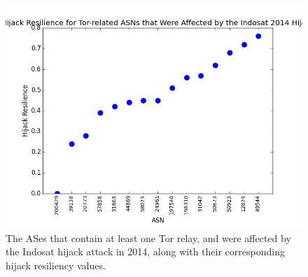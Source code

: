 \begin{figure}
\centering
\includegraphics[width=.5\textwidth]{case_study_graph}
\caption{The ASes that contain at least one Tor relay, and were affected by the Indosat hijack attack in 2014, along with their corresponding hijack resiliency values.}
\label{fig:case_study}
\end{figure}
